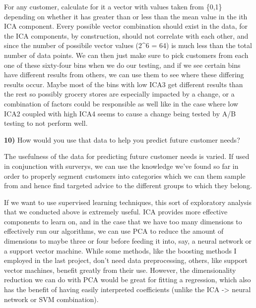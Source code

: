\documentclass{article}
\begin{document}
For any customer, calculate for it a vector with values taken from
\{0,1\} depending on whether it has greater than or less than the mean
value in the ith ICA component. Every possible vector combination should
exist in the data, for the ICA components, by construction, should not
correlate with each other, and since the number of possibile vector
values (2\^{}6 = 64) is much less than the total number of data points.
We can then just make sure to pick customers from each one of these
sixty-four bins when we do our testing, and if we see certain bins have
different results from others, we can use them to see where these
differing results occur. Maybe most of the bins with low ICA3 get
different results than the rest so possibly grocery stores are
especially impacted by a change, or a combination of factors could be
responsible as well like in the case where low ICA2 coupled with high
ICA4 seems to cause a change being tested by A/B testing to not perform
well.

    \textbf{10)} How would you use that data to help you predict future
customer needs?

    The usefulness of the data for predicting future customer needs is
varied. If used in conjunction with surverys, we can use the knowledge
we've found so far in order to properly segment customers into
categories which we can them sample from and hence find targeted advice
to the different groups to which they belong.

If we want to use supervised learning techniques, this sort of
exploratory analysis that we conducted above is extremely useful. ICA
provides more effective components to learn on, and in the case that we
have too many dimensions to effectively run our algorithms, we can use
PCA to reduce the amount of dimensions to maybe three or four before
feeding it into, say, a neural network or a support vector machine.
While some methods, like the boosting methods I employed in the last
project, don't need data preprocessing, others, like support vector
machines, benefit greatly from their use. However, the dimensionality
reduction we can do with PCA would be great for fitting a regression,
which also has the benefit of having easily interpreted coefficients
(unlike the ICA -\textgreater{} neural network or SVM combination).


    
    
    
    
\end{document}
